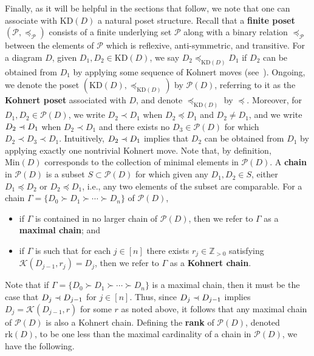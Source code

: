 \documentclass[letterpaper,10pt]{article}
\newcommand{\precdot}{\prec\mathrel{\mkern-5mu}\mathrel{\cdot}}
\begin{document}
Finally, as it will be helpful in the sections that follow, we note that one can associate with $\mathrm{KD}(D)$ a natural poset structure. Recall that a \textbf{finite poset} $(\mathcal{P},\preceq_{\mathcal{P}})$ consists of a finite underlying set $\mathcal{P}$ along with a binary relation $\preceq_{\mathcal{P}}$ between the elements of $\mathcal{P}$ which is reflexive, anti-symmetric, and transitive. For a diagram $D$, given $D_1,D_2\in \mathrm{KD}(D)$, we say $D_2\preceq_{\mathrm{KD}(D)} D_1$ if $D_2$ can be obtained from $D_1$ by applying some sequence of Kohnert moves (see~\cite{KP3,KP2}). Ongoing, we denote the poset $(\mathrm{KD}(D),\preceq_{\mathrm{KD}(D)})$ by $\mathcal{P}(D)$, referring to it as the \textbf{Kohnert poset} associated with $D$, and denote $\preceq_{\mathrm{KD}(D)}$ by $\preceq$. Moreover, for $D_1,D_2\in\mathcal{P}(D)$, we write $D_2\prec D_1$ when $D_2\preceq D_1$ and $D_2\neq D_1$, and we write $D_2\precdot D_1$ when $D_2\prec D_1$ and there exists no $D_3\in\mathcal{P}(D)$ for which $D_2\prec D_3\prec D_1$. Intuitively, $D_2 \precdot D_1$ implies that $D_2$ can be obtained from $D_1$ by applying exactly one nontrivial Kohnert move. Note that, by definition, $\mathrm{Min}(D)$ corresponds to the collection of minimal elements in $\mathcal{P}(D)$. A \textbf{chain} in $\mathcal{P}(D)$ is a subset $S\subset \mathcal{P}(D)$ for which given any $D_1,D_2\in S$, either $D_1\preceq D_2$ or $D_2\preceq D_1$, i.e., any two elements of the subset are comparable. For a chain $\Gamma=\{D_0\succ D_1\succ\cdots\succ D_n\}$ of $\mathcal{P}(D)$,
\begin{itemize}
    \item if $\Gamma$ is contained in no larger chain of $\mathcal{P}(D)$, then we refer to $\Gamma$ as a \textbf{maximal chain}; and
    \item if $\Gamma$ is such that for each $j\in [n]$ there exists $r_j\in\mathbb{Z}_{>0}$ satisfying $\mathcal{K}(D_{j-1},r_j)=D_j$, then we refer to $\Gamma$ as a \textbf{Kohnert chain}.
\end{itemize}
Note that if $\Gamma=\{D_0\succ D_1\succ\cdots\succ D_n\}$ is a maximal chain, then it must be the case that $D_{j}\precdot D_{j-1}$ for $j\in [n]$. Thus, since $D_{j}\precdot D_{j-1}$ implies $D_j=\mathcal{K}(D_{j-1},r)$ for some $r$ as noted above, it follows that any maximal chain of $\mathcal{P}(D)$ is also a Kohnert chain. Defining the \textbf{rank} of $\mathcal{P}(D)$, denoted $\mathrm{rk}(D)$, to be one less than the maximal cardinality of a chain in $\mathcal{P}(D)$, we have the following.
\end{document}
